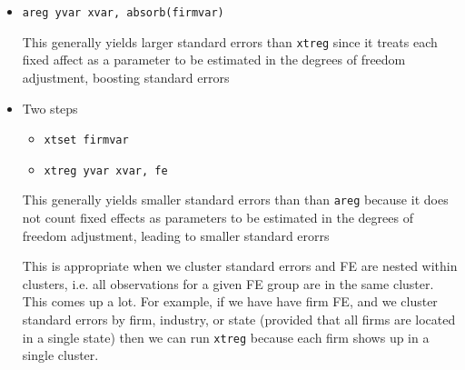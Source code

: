 \documentclass[12pt]{article}
\theoremstyle{plain}
\theoremstyle{definition}
\theoremstyle{remark}
\begin{document}
\begin{itemize}
  \item \texttt{areg yvar xvar, absorb(firmvar)}

    This generally yields larger standard errors than \texttt{xtreg}
    since it treats each fixed affect as a parameter to be estimated in
    the degrees of freedom adjustment, boosting standard errors
  \item Two steps
    \begin{itemize}
      \item \texttt{xtset firmvar}
      \item \texttt{xtreg yvar xvar, fe}
    \end{itemize}
    This generally yields smaller standard errors than than
    \texttt{areg} because it does not count fixed effects as parameters
    to be estimated in the degrees of freedom adjustment, leading to
    smaller standard erorrs

    This is appropriate when we cluster standard errors and FE are
    nested within clusters, i.e. all observations for a given FE group
    are in the same cluster.
    This comes up a lot.
    For example, if we have have firm FE, and we cluster standard errors
    by firm, industry, or state (provided that all firms are located in
    a single state) then we can run \texttt{xtreg}
    because each firm shows up in a single cluster.
\end{itemize}







\end{document}
